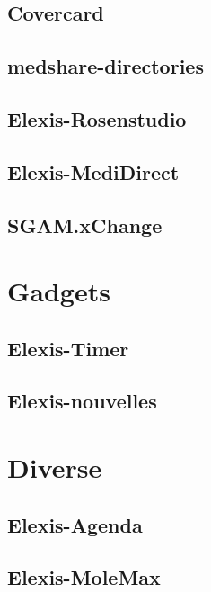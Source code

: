 \documentclass[paper=a4,BCOR8.25mm]{scrartcl}
\begin{document}
\subsection{Covercard}
\subsection{medshare-directories}
\subsection{Elexis-Rosenstudio}
\subsection{Elexis-MediDirect}
\subsection{SGAM.xChange}


\section{Gadgets}
\subsection{Elexis-Timer}
\subsection{Elexis-nouvelles}

\section{Diverse}
\subsection{Elexis-Agenda}
\subsection{Elexis-MoleMax}
\end{document}
